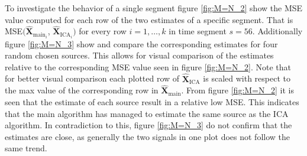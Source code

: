 \noindent
To investigate the behavior of a single segment figure \ref{fig:M=N_2} show the MSE value computed for each row of the two estimates of a specific segment. 
That is MSE$(\hat{\mathbf{X}}_{\text{main}_{i}}$, $\hat{\mathbf{X}}_{\text{ICA}_{i}})$ for every row $i = 1, \dots, k$ in time segment $s = 56$. 
Additionally figure \ref{fig:M=N_3} show and compare the corresponding estimates for four random chosen sources. 
This allows for visual comparison of the estimates relative to the corresponding MSE value seen in figure \ref{fig:M=N_2}. 
Note that for better visual comparison each plotted row of $\hat{\mathbf{X}}_{\text{ICA}}$ is scaled with respect to the max value of the corresponding row in $\hat{\mathbf{X}}_{\text{main}}$.
From figure \ref{fig:M=N_2} it is seen that the estimate of each source result in a relative low MSE. This indicates that the main algorithm has managed to estimate the same source as the ICA algorithm. 
In contradiction to this, figure \ref{fig:M=N_3} do not confirm that the estimates are close, as generally the two signals in one plot does not follow the same trend.   

